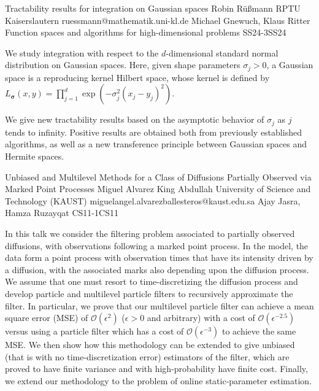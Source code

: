 \begin{talk}
  {Tractability results for integration on Gaussian spaces}%
  {Robin Rüßmann}%
  {RPTU Kaiserslautern}%
  {ruessmann@mathematik.uni-kl.de}%
  {Michael Gnewuch, Klaus Ritter}%
{Function spaces and algorithms for high-dimensional problems}
{}{SS24-3}{SS24}

			
We study integration with respect to the $d$-dimensional standard normal distribution on Gaussian spaces. Here, given shape parameters $\sigma_j>0$, a Gaussian space is a reproducing kernel Hilbert space, whose kernel is defined by $L_{\boldsymbol{\sigma}}(x,y)=\prod_{j=1}^d \exp(-\sigma_j^2(x_j-y_j)^2)$.  

We give new tractability results based on the asymptotic behavior of $\sigma_j$ as $j$ tends to infinity. Positive results are obtained both from previously established algorithms, as well as a new transference principle between Gaussian spaces and Hermite spaces.   

\end{talk}

\begin{talk}
  {Unbiased and Multilevel Methods for a Class of Diffusions Partially Observed via Marked Point Processes}%
  {Miguel Alvarez}%
  {King Abdullah University of Science and Technology (KAUST)}%
  {miguelangel.alvarezballesteros@kaust.edu.sa}%
  {Ajay Jasra, Hamza Ruzayqat}%
{}{}{CS11-1}{CS11}

			
In this talk we consider the filtering problem associated to partially observed diffusions, with observations following a marked point process.
In the model, the data form a point process with observation times that have its intensity driven by a diffusion, with the associated marks also depending upon the diffusion process.
We assume that one must resort to time-discretizing the diffusion process and develop particle and multilevel particle filters to recursively approximate the filter.
In particular, we prove that our multilevel particle filter can achieve a mean square error (MSE) of $\mathcal{O}(\epsilon^2)$ ($\epsilon>0$ and arbitrary) with a cost
of $\mathcal{O}(\epsilon^{-2.5})$ versus using a particle filter which has a cost of $\mathcal{O}(\epsilon^{-3})$ to achieve the same MSE. We then show how this methodology can be extended to give unbiased (that is with no time-discretization error) estimators of the filter, which are proved to have finite variance and with high-probability have finite cost. Finally, we extend our methodology to the problem of online static-parameter estimation.

\medskip

\end{talk}

